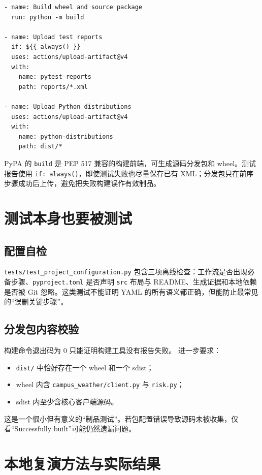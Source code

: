 \documentclass[UTF8,zihao=-4,a4paper]{ctexart}
\newcommand{\code}[1]{\texttt{#1}}
\begin{document}
\begin{lstlisting}[style=codestyle]
- name: Build wheel and source package
  run: python -m build

- name: Upload test reports
  if: ${{ always() }}
  uses: actions/upload-artifact@v4
  with:
    name: pytest-reports
    path: reports/*.xml

- name: Upload Python distributions
  uses: actions/upload-artifact@v4
  with:
    name: python-distributions
    path: dist/*
\end{lstlisting}

PyPA 的 \code{build} 是 PEP 517 兼容的构建前端，可生成源码分发包和 wheel\cite{pypa-build}。测试报告使用 \code{if: always()}，即使测试失败也尽量保存已有 XML；分发包只在前序步骤成功后上传，避免把失败构建误作有效制品。

\section{测试本身也要被测试}

\subsection{配置自检}

\code{tests/test\_project\_configuration.py} 包含三项离线检查：工作流是否出现必备步骤、\code{pyproject.toml} 是否声明 \code{src} 布局与 README、生成证据和本地依赖是否被 Git 忽略。这类测试不能证明 YAML 的所有语义都正确，但能防止最常见的“误删关键步骤”。

\subsection{分发包内容校验}

构建命令退出码为 0 只能证明构建工具没有报告失败。 进一步要求：

\begin{itemize}
  \item \code{dist/} 中恰好存在一个 wheel 和一个 sdist；
  \item wheel 内含 \code{campus\_weather/client.py} 与 \code{risk.py}；
  \item sdist 内至少含核心客户端源码。
\end{itemize}

这是一个很小但有意义的“制品测试”。若包配置错误导致源码未被收集，仅看“Successfully built”可能仍然遗漏问题。

\section{本地复演方法与实际结果}
\end{document}
